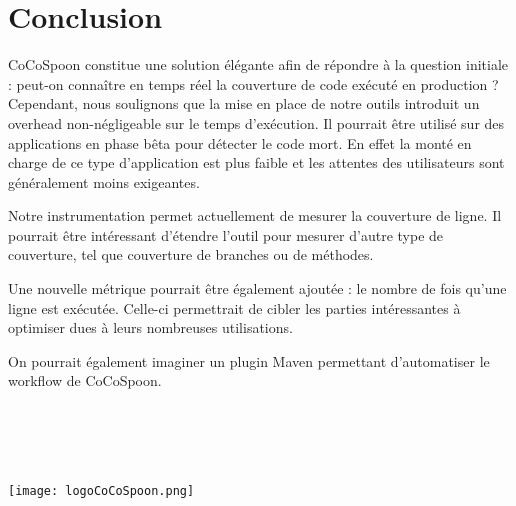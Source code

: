\chapter*{Conclusion}
	\thispagestyle{conclusion}
	
\par CoCoSpoon constitue une solution élégante afin de répondre à la question initiale : peut-on connaître en temps réel la couverture de code exécuté en production ? Cependant, nous soulignons que la mise en place de notre outils introduit un overhead non-négligeable sur le temps d'exécution. Il pourrait être utilisé sur des applications en phase bêta pour détecter le code mort. En effet la monté en charge de ce type d'application est plus faible et les attentes des utilisateurs sont généralement moins exigeantes.
\par Notre instrumentation permet actuellement de mesurer la couverture de ligne. Il pourrait être intéressant d'étendre l'outil pour mesurer d'autre type de couverture, tel que couverture de branches ou de méthodes. \par Une nouvelle métrique pourrait être également ajoutée : le nombre de fois qu'une ligne est exécutée. Celle-ci permettrait de cibler les parties intéressantes à optimiser dues à leurs nombreuses utilisations. \par On pourrait également imaginer un plugin Maven permettant d'automatiser le workflow de CoCoSpoon.

~\\
~\\
~\\
~\\

\centering
\texttt{[image: logoCoCoSpoon.png]}
